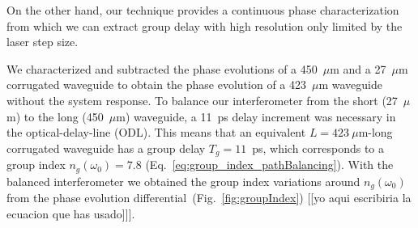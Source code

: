 \documentclass[journal]{IEEEtran}
\begin{document}
On the other hand, our technique provides a continuous phase characterization from which we can extract group delay with high resolution only limited by the laser step size.

We characterized and subtracted the phase evolutions of a 450~$\mu$m and a 27~$\mu$m corrugated waveguide to obtain the phase evolution of a 423~$\mu$m waveguide without the system response. To balance our interferometer from the short (27~$\mu$m) to the long (450~$\mu$m) waveguide, a 11~ps delay increment was necessary in the optical-delay-line (ODL). This means that an equivalent $L=423~\mu$m-long corrugated waveguide has a group delay $T_g=11$~ps, which corresponds to a group index $n_g(\omega_0)=7.8$ (Eq.~\ref{eq:group_index_pathBalancing}). With the balanced interferometer  we obtained the group index variations around $n_g(\omega_0)$ from the phase evolution differential~(Fig.~\ref{fig:groupIndex}) [[yo aqui escribiria la ecuacion que has usado]]].





\end{document}
